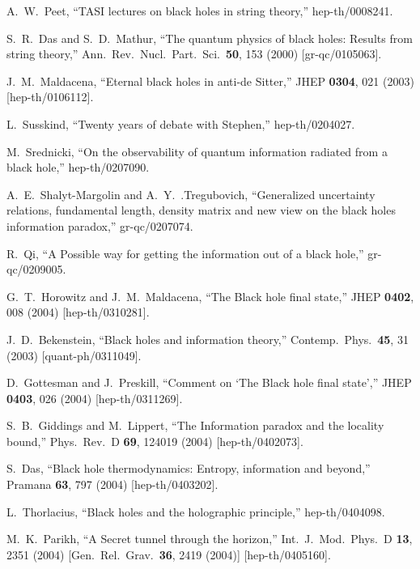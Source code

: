 \documentclass[12pt]{article}
\begin{document}
\begin{thebibliography}{99}
  A.~W.~Peet,
  ``TASI lectures on black holes in string theory,''
  hep-th/0008241.
  
  S.~R.~Das and S.~D.~Mathur,
  ``The quantum physics of black holes: Results from string theory,''
  Ann.\ Rev.\ Nucl.\ Part.\ Sci.\  {\bf 50}, 153 (2000)
  [gr-qc/0105063].

  J.~M.~Maldacena,
  ``Eternal black holes in anti-de Sitter,''
  JHEP {\bf 0304}, 021 (2003)
  [hep-th/0106112].

  L.~Susskind,
  ``Twenty years of debate with Stephen,''
  hep-th/0204027.

  M.~Srednicki,
  ``On the observability of quantum information radiated from a black hole,''
  hep-th/0207090.

  A.~E.~Shalyt-Margolin and A.~Y.~.Tregubovich,
  ``Generalized uncertainty relations, fundamental length, density matrix and new view on the black holes information paradox,''
  gr-qc/0207074.

  R.~Qi,
  ``A Possible way for getting the information out of a black hole,''
  gr-qc/0209005.

  G.~T.~Horowitz and J.~M.~Maldacena,
  ``The Black hole final state,''
  JHEP {\bf 0402}, 008 (2004)
  [hep-th/0310281].

  J.~D.~Bekenstein,
  ``Black holes and information theory,''
  Contemp.\ Phys.\  {\bf 45}, 31 (2003)
  [quant-ph/0311049].

  D.~Gottesman and J.~Preskill,
  ``Comment on `The Black hole final state',''
  JHEP {\bf 0403}, 026 (2004)
  [hep-th/0311269].

  S.~B.~Giddings and M.~Lippert,
  ``The Information paradox and the locality bound,''
  Phys.\ Rev.\ D {\bf 69}, 124019 (2004)
  [hep-th/0402073].

  S.~Das,
  ``Black hole thermodynamics: Entropy, information and beyond,''
  Pramana {\bf 63}, 797 (2004)
  [hep-th/0403202].

  L.~Thorlacius,
  ``Black holes and the holographic principle,''
  hep-th/0404098.

  M.~K.~Parikh,
  ``A Secret tunnel through the horizon,''
  Int.\ J.\ Mod.\ Phys.\ D {\bf 13}, 2351 (2004)
  [Gen.\ Rel.\ Grav.\  {\bf 36}, 2419 (2004)]
  [hep-th/0405160].


\end{thebibliography}
\end{document}
